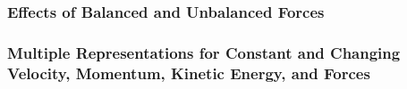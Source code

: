 \documentclass[dvipsnames]{article}
\begin{document}
\subsubsection{Effects of Balanced and Unbalanced Forces}

\subsubsection{Multiple Representations for Constant and Changing Velocity, Momentum, Kinetic Energy, and Forces}













\end{document}
